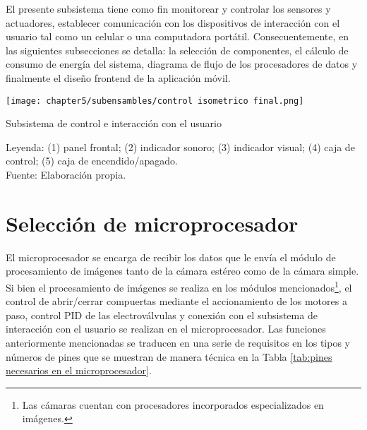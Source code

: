 El presente subsistema tiene como fin monitorear y controlar los sensores y actuadores, establecer comunicación con los dispositivos de interacción con el usuario tal como un celular o una computadora portátil. Consecuentemente, en las siguientes subsecciones se detalla: la selección de componentes, el cálculo de consumo de energía del sistema, diagrama de flujo de los procesadores de datos y finalmente el diseño frontend de la aplicación móvil. %

\begin{myfigure}[H]
	\footnotesize\centering
	\texttt{[image: chapter5/subensambles/control isometrico final.png]}
	\caption{Subsistema de control e interacción con el usuario}
	\begin{myflushcenter}
		Leyenda: (1) panel frontal; (2) indicador sonoro; (3) indicador visual; (4) caja de control; (5) caja de encendido/apagado.\\
		Fuente: Elaboración propia.
	\end{myflushcenter}
	\label{fig:subsistema de control e interaccion con el usuario}
\end{myfigure}

\vspace{-2.0em}

\section{Selección de microprocesador}
\label{sssec:seleccion de microprocesador}

El microprocesador se encarga de recibir los datos que le envía el módulo de procesamiento de imágenes tanto de la cámara estéreo como de la cámara simple. Si bien el procesamiento de imágenes se realiza en los módulos mencionados\footnote{Las cámaras cuentan con procesadores incorporados especializados en imágenes.}, el control de abrir/cerrar compuertas mediante el accionamiento de los motores a paso, control PID de las electroválvulas y conexión con el subsistema de interacción con el usuario se realizan en el microprocesador. Las funciones anteriormente mencionadas se traducen en una serie de requisitos en los tipos y números de pines que se muestran de manera técnica en la Tabla \ref{tab:pines necesarios en el microprocesador}.


